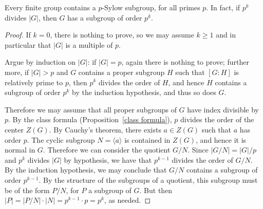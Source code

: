 \begin{proposition}
Every finite group contains a $p$-Sylow subgroup, for all primes $p$. In fact, if $p^k$ divides $|G|$, then $G$ has a subgroup of order $p^k$.
\end{proposition}
\begin{proof}
If $k=0$, there is nothing to prove, so we may assume $k\geq 1$ and in particular that $|G|$ is a multiple of $p$.\par
Argue by induction on $|G|$: if $|G|=p$, again there is nothing to prove; further more, if $|G|>p$ and $G$ contains a proper subgroup $H$ such that $[G:H]$ is relatively 
prime to $p$, then $p^k$ divides the order of $H$, and hence $H$ contains a subgroup of order $p^k$ by the induction hypothesis, and thus so does $G$.\par
Therefore we may assume that all proper subgroups of $G$ have index divisible by $p$. By the class formula (Proposition~\ref{class formula}), $p$ divides the order of 
the center $Z(G)$. By Cauchy's theorem, there exists $a\in Z(G)$ such that $a$ has order $p$. The cyclic subgroup $N=\langle a\rangle$ is contained in $Z(G)$, and hence 
it is normal in $G$. Therefore we can consider the quotient $G/N$. Since $|G/N|=|G|/p$ and $p^k$ divides $|G|$ by hypothesis, we have that $p^{k-1}$ divides the order 
of $G/N$. By the induction hypothesis, we may conclude that $G/N$ contains a subgroup of order $p^{k-1}$. By the structure of the subgroups of a quotient, this subgroup 
must be of the form $P/N$, for $P$ a subgroup of $G$. But then $|P|=|P/N|\cdot|N|=p^{k-1}\cdot p=p^k$, as needed.
\end{proof}
